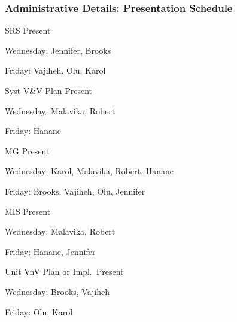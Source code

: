 \documentclass[t,12pt,numbers,fleqn]{beamer}
\begin{document}
\begin{frame}
\frametitle{Administrative Details: Presentation Schedule}

\bi
\item SRS Present
\bi
\item Wednesday: Jennifer, Brooks
\item Friday: Vajiheh, Olu, Karol
\ei
\item Syst V\&V Plan Present
\bi
\item Wednesday: Malavika, Robert
\item Friday: Hanane
\ei
\item MG Present
\bi
\item Wednesday: Karol, Malavika, Robert, Hanane
\item Friday: Brooks, Vajiheh, Olu, Jennifer
\ei
\item MIS Present
\bi
\item Wednesday: Malavika, Robert
\item Friday: Hanane,  Jennifer
\ei
\item Unit VnV Plan or Impl.\ Present
\bi
\item Wednesday: Brooks, Vajiheh
\item Friday: Olu, Karol
\ei

\ei

\end{frame}

\end{document}
